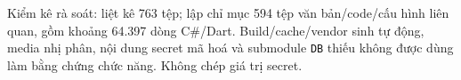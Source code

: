 Kiểm kê rà soát: liệt kê 763 tệp; lập chỉ mục 594 tệp văn bản/\allowbreak{}code/\allowbreak{}cấu hình liên quan, gồm khoảng 64.397 dòng C\#/\allowbreak{}Dart. Build/\allowbreak{}cache/\allowbreak{}vendor sinh tự động, media nhị phân, nội dung secret mã hoá và submodule \texttt{DB} thiếu không được dùng làm bằng chứng chức năng. Không chép giá trị secret.
